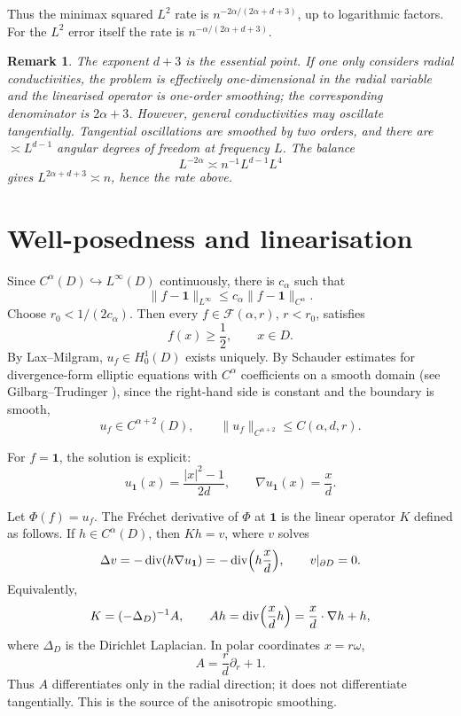 \documentclass[11pt]{article}
\newcommand{\1}{\mathbf{1}}
\DeclareMathOperator{\diver}{div}
\newtheorem{remark}[theorem]{Remark}
\begin{document}
Thus the minimax squared $L^2$ rate is $n^{-2\alpha/(2\alpha+d+3)}$, up to logarithmic factors. For the $L^2$ error itself the rate is $n^{-\alpha/(2\alpha+d+3)}$.

\begin{remark}
The exponent $d+3$ is the essential point. If one only considers radial conductivities, the problem is effectively one-dimensional in the radial variable and the linearised operator is one-order smoothing; the corresponding denominator is $2\alpha+3$. However, general conductivities may oscillate tangentially. Tangential oscillations are smoothed by two orders, and there are $\asymp L^{d-1}$ angular degrees of freedom at frequency $L$. The balance
\[
L^{-2\alpha}\asymp n^{-1}L^{d-1}L^4
\]
gives $L^{2\alpha+d+3}\asymp n$, hence the rate above.
\end{remark}

\section{Well-posedness and linearisation}

Since $C^\alpha(D)\hookrightarrow L^\infty(D)$ continuously, there is $c_\alpha$ such that
\[
\|f-\1\|_{L^\infty}\le c_\alpha\|f-\1\|_{C^\alpha}.
\]
Choose $r_0<1/(2c_\alpha)$. Then every $f\in\mathcal F(\alpha,r)$, $r<r_0$, satisfies
\[
f(x)\ge \frac12,\qquad x\in D.
\]
By Lax--Milgram, $u_f\in H^1_0(D)$ exists uniquely. By Schauder estimates for divergence-form elliptic equations with $C^\alpha$ coefficients on a smooth domain (see Gilbarg--Trudinger \cite{GT}), since the right-hand side is constant and the boundary is smooth,
\[
u_f\in C^{\alpha+2}(D),
\qquad
\|u_f\|_{C^{\alpha+2}}\le C(\alpha,d,r).
\]

For $f=\1$, the solution is explicit:
\[
u_{\1}(x)=\frac{|x|^2-1}{2d},
\qquad
\nabla u_{\1}(x)=\frac{x}{d}.
\]

Let $\Phi(f)=u_f$. The Fréchet derivative of $\Phi$ at $\1$ is the linear operator $K$ defined as follows. If $h\in C^\alpha(D)$, then $Kh=v$, where $v$ solves
\[
\Delta v=-\diver(h\nabla u_{\1})
=
-\diver\Bigl(h\frac{x}{d}\Bigr),
\qquad v|_{\partial D}=0.
\]
Equivalently,
\begin{equation}\label{eq:Kdef}
K=(-\Delta_D)^{-1}A,
\qquad
A h=\diver\Bigl(\frac{x}{d}h\Bigr)
=
\frac{x}{d}\cdot\nabla h+h,
\end{equation}
where $\Delta_D$ is the Dirichlet Laplacian. In polar coordinates $x=r\omega$,
\[
A=\frac r d\partial_r+1.
\]
Thus $A$ differentiates only in the radial direction; it does not differentiate tangentially. This is the source of the anisotropic smoothing.
\end{document}
